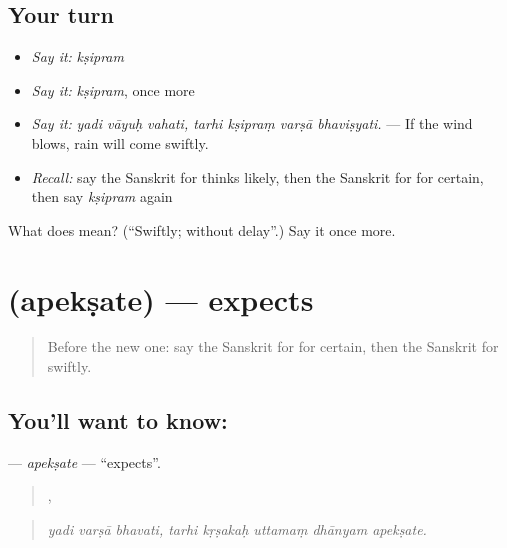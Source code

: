 \subsection*{Your turn}
\begin{itemize}
\raggedright
  \item \emph{Say it:} \emph{kṣipram}
  \item \emph{Say it:} \emph{kṣipram}, once more
  \item \emph{Say it:} \emph{yadi vāyuḥ vahati, tarhi kṣipraṃ varṣā bhaviṣyati.} — If the wind blows, rain will come swiftly.
  \item \emph{Recall:} say the Sanskrit for thinks likely, then the Sanskrit for for certain, then say \emph{kṣipram} again
\end{itemize}

\begin{tcolorbox}[breakable,colback=teal!4,colframe=teal!35!black,title={Before you move on}]
What does  mean? (\textquotedblleft{}Swiftly; without delay\textquotedblright{}.) Say it once more.
\end{tcolorbox}
\section[\texorpdfstring{\sk{अपेक्षते} (apekṣate)}{अपेक्षते (apekṣate)}]{ (apekṣate) — expects}

\label{lesson:SA-C367-apeksate}



\begin{quote}
Before the new one: say the Sanskrit for for certain, then the Sanskrit for swiftly.
\end{quote}

\subsection*{You'll want to know: }
\textbf{} — \emph{apekṣate} — \textquotedblleft{}expects\textquotedblright{}.

\begin{quote}
  ,     
\end{quote}

\begin{quote}
\emph{yadi varṣā bhavati, tarhi kṛṣakaḥ uttamaṃ dhānyam apekṣate.}
\end{quote}

